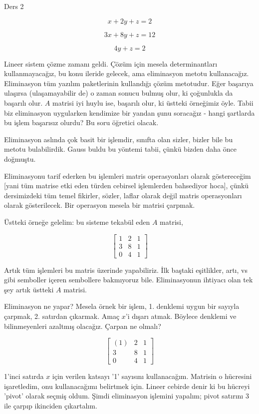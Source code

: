 \documentclass[12pt,fleqn]{article}\usepackage{../../common}
\begin{document}
Ders 2

$$ x + 2y + z = 2 $$

$$ 3x + 8y + z = 12 $$

$$ 4y + z = 2 $$

Lineer sistem çözme zamanı geldi. Çözüm için mesela determinantları
kullanmayacağız, bu konu ileride gelecek, ama eliminasyon metotu
kullanacağız. Eliminasyon tüm yazılım paketlerinin kullandığı çözüm
metotudur. Eğer başarıya ulaşırsa (ulaşamayabilir de) o zaman sonucu bulmuş
olur, ki çoğunlukla da başarılı olur. $A$ matrisi iyi huylu ise, başarılı
olur, ki üstteki örneğimiz öyle. Tabii biz eliminasyon uygularken kendimize
bir yandan şunu soracağız - hangi şartlarda bu işlem başarısız olurdu? Bu
soru öğretici olacak. 

Eliminasyon aslında çok basit bir işlemdir, sınıfta olan sizler, bizler
bile bu metotu bulabilirdik. Gauss buldu bu yöntemi tabii, çünkü bizden
daha önce doğmuştu. 

Eliminasyonu tarif ederken bu işlemleri matris operasyonları olarak
göstereceğim [yani tüm matrise etki eden türden cebirsel işlemlerden
bahsediyor hoca], çünkü dersimizdeki tüm temel fikirler, sözler, laflar
olarak değil matris operasyonları olarak gösterilecek. Bir operasyon mesela
bir matrisi çarpmak. 

Üstteki örneğe gelelim: bu sisteme tekabül eden $A$ matrisi, 

$$ 
\left[\begin{array}{rrr}
1 & 2 & 1 \\
3 & 8 & 1 \\
0 & 4 & 1
\end{array}\right]
 $$

Artık tüm işlemleri bu matris üzerinde yapabiliriz. İlk baştaki eşitlikler,
artı, vs gibi semboller içeren sembollere bakmıyoruz bile. Eliminasyonun
ihtiyacı olan tek şey artık üstteki $A$ matrisi. 

Eliminasyon ne yapar? Mesela örnek bir işlem, 1. denklemi uygun bir sayıyla
çarpmak, 2. satırdan çıkarmak. Amaç $x$'i dışarı atmak. Böylece denklemi ve
bilinmeyenleri azaltmış olacağız. Çarpan ne olmalı? 

$$ 
\left[\begin{array}{rrr}
(1) & 2 & 1 \\
3 & 8 & 1 \\
0 & 4 & 1
\end{array}\right]
$$

1'inci satırda $x$ için verilen katsayı '1' sayısını kullanacağım. Matrisin
o hücresini işaretledim, onu kullanacağımı belirtmek için. Lineer cebirde
denir ki bu hücreyi 'pivot' olarak seçmiş oldum. Şimdi eliminasyon işlemini
yapalım; pivot satırını 3 ile çarpıp ikinciden çıkartalım.
\end{document}
